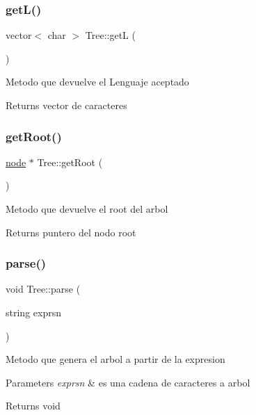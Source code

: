 \hypertarget{class_tree_a9acb0c1a6d759b7b74182cc6154ebefb}{}\label{class_tree_a9acb0c1a6d759b7b74182cc6154ebefb} 
\subsubsection{\texorpdfstring{get\+L()}{getL()}}
{\footnotesize\ttfamily vector$<$ char $>$ Tree\+::getL (\begin{DoxyParamCaption}{ }\end{DoxyParamCaption})}

Metodo que devuelve el Lenguaje aceptado \begin{DoxyReturn}{Returns}
vector de caracteres 
\end{DoxyReturn}
\hypertarget{class_tree_a506b3e509bb7e709cea6f8b07bc24e02}{}\label{class_tree_a506b3e509bb7e709cea6f8b07bc24e02} 
\subsubsection{\texorpdfstring{get\+Root()}{getRoot()}}
{\footnotesize\ttfamily \hyperlink{structnode}{node} $\ast$ Tree\+::get\+Root (\begin{DoxyParamCaption}{ }\end{DoxyParamCaption})}

Metodo que devuelve el root del arbol \begin{DoxyReturn}{Returns}
puntero del nodo root 
\end{DoxyReturn}
\hypertarget{class_tree_a0a58a389239c81cca1005635279ff5b4}{}\label{class_tree_a0a58a389239c81cca1005635279ff5b4} 
\subsubsection{\texorpdfstring{parse()}{parse()}}
{\footnotesize\ttfamily void Tree\+::parse (\begin{DoxyParamCaption}\item[{string}]{exprsn }\end{DoxyParamCaption})}

Metodo que genera el arbol a partir de la expresion 
\begin{DoxyParams}{Parameters}
{\em exprsn} & es una cadena de caracteres a arbol \\
\hline
\end{DoxyParams}
\begin{DoxyReturn}{Returns}
void 
\end{DoxyReturn}
\hypertarget{class_tree_a732a521b8b2989336a4fb080afb28f52}{}\label{class_tree_a732a521b8b2989336a4fb080afb28f52} 
